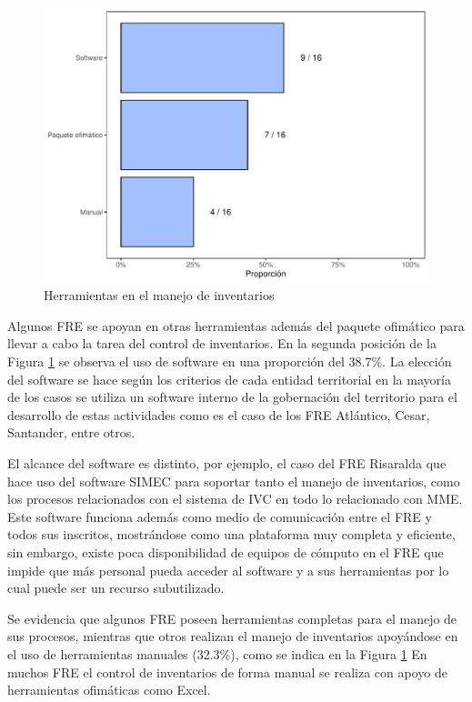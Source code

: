 \documentclass[
]{book}
\begin{document}
\begin{figure}
\includegraphics[width=0.85\linewidth]{InformeFinal_files/figure-latex/HerramientasManejoInventarios-1} \caption{Herramientas en el manejo de inventarios}\label{fig:HerramientasManejoInventarios}
\end{figure}

Algunos FRE se apoyan en otras herramientas además del paquete ofimático para llevar a cabo la tarea del control de inventarios. En la segunda posición de la Figura \ref{fig:HerramientasManejoInventarios} se observa el uso de software en una proporción del 38.7\%. La elección del software se hace según los criterios de cada entidad territorial en la mayoría de los casos se utiliza un software interno de la gobernación del territorio para el desarrollo de estas actividades como es el caso de los FRE Atlántico, Cesar, Santander, entre otros.

El alcance del software es distinto, por ejemplo, el caso del FRE Risaralda que hace uso del software SIMEC para soportar tanto el manejo de inventarios, como los procesos relacionados con el sistema de IVC en todo lo relacionado con MME. Este software funciona además como medio de comunicación entre el FRE y todos sus inscritos, mostrándose como una plataforma muy completa y eficiente, sin embargo, existe poca disponibilidad de equipos de cómputo en el FRE que impide que más personal pueda acceder al software y a sus herramientas por lo cual puede ser un recurso subutilizado.

Se evidencia que algunos FRE poseen herramientas completas para el manejo de sus procesos, mientras que otros realizan el manejo de inventarios apoyándose en el uso de herramientas manuales (32.3\%), como se indica en la Figura \ref{fig:HerramientasManejoInventarios} En muchos FRE el control de inventarios de forma manual se realiza con apoyo de herramientas ofimáticas como Excel.
\end{document}
